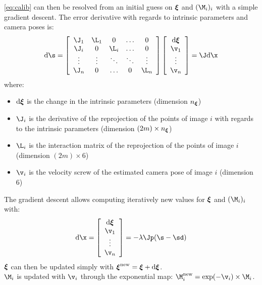 \documentclass{ecnreport}
\begin{document}
\eqref{eq:calib} can then be resolved from an initial guess on ${\boldsymbol{\xi}}$ and $(\M_i)_i$ with a simple gradient descent. 
The error derivative with regards to intrinsic parameters and camera poses is:
\newcommand{\der}{\text{d}}
\begin{equation}
 \der\s =  \left[\begin{array}{ccccc}
           \J_1 & \L_1 &  0 &  \hdots & 0 \\ 
           \J_i & 0 & \L_i &  \hdots & 0 \\
           \vdots& \vdots & \ddots & \ddots & \vdots\\
           \J_n & 0 & \hdots & 0 & \L_n
            \end{array}\right]
            \left[\begin{array}{c}\der\xii \\ \v_1 \\ \vdots \\ \v_n\end{array}\right]
             = \J\der\x
\end{equation}
where:
\begin{itemize}
\item $\der\xii$ is the change in the intrinsic parameters (dimension $n_{\boldsymbol{\xi}}$)
 \item $\J_i$ is the derivative of the reprojection of the points of image $i$ with regards to the intrinsic parameters (dimension $(2m)\times n_{\boldsymbol{\xi}}$)
 \item $\L_i$ is the interaction matrix of the reprojection of the points of image $i$ (dimension $(2m)\times 6$)
 \item $\v_i$ is the velocity screw of the estimated camera pose of image $i$ (dimension $6$)
\end{itemize}
The gradient descent allows computing iteratively new values for ${\boldsymbol{\xi}}$ and $(\M_i)_i$ with:
\begin{equation}
 \der\x = \left[\begin{array}{c}\der\xii \\ \v_1 \\ \vdots \\ \v_n\end{array}\right] = -\lambda\Jp(\s - \sd)
\end{equation}
${\boldsymbol{\xi}}$ can then be updated simply with $\xii^{\text{new}} = \xii + \der\xii$.\\
$\M_i$ is updated with $\v_i$ through the exponential map: $\M_i^{\text{new}} = \exp(-\v_i)\times\M_i$.\\
\end{document}
